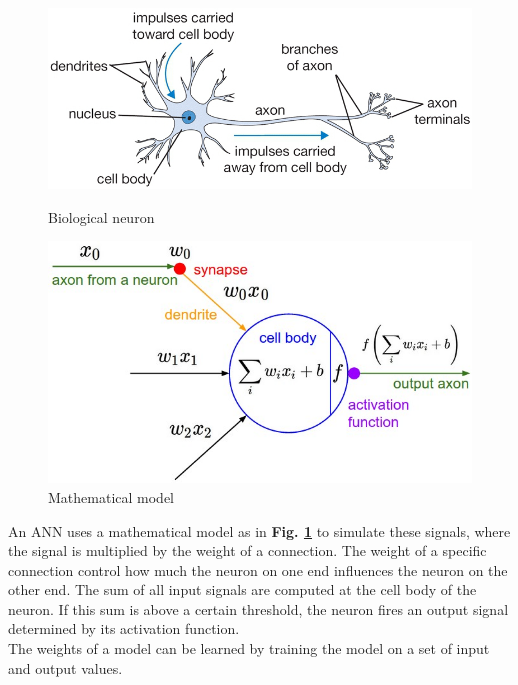 \begin{figure}
    \begin{minipage}{0.54\textwidth}
        \centering
            \includegraphics[width=1\textwidth]{fig/neuron}
            \caption{Biological neuron}
            \label{fig1}
    \end{minipage}
    \begin{minipage}{0.4\textwidth}
        \centering
            \includegraphics[width=1\textwidth]{fig/neuron_model}
            \caption{Mathematical model}
            \label{fig2}
    \end{minipage}
\end{figure}

\noindent An ANN uses a mathematical model as in \textbf{Fig. \ref{fig2}} to simulate these signals, where the signal is multiplied by the weight of a connection. The weight of a specific connection control how much the neuron on one end influences the neuron on the other end. The sum of all input signals are computed at the cell body of the neuron. If this sum is above a certain threshold, the neuron fires an output signal determined by its activation function. \\

\noindent The weights of a model can be learned by training the model on a set of input and output values. \\

